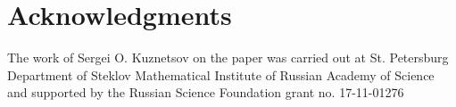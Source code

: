 \documentclass[runningheads]{llncs}
\begin{document}
\section*{Acknowledgments}

The work of Sergei O. Kuznetsov on the paper was carried out
at St. Petersburg Department of Steklov Mathematical Institute of Russian Academy of
Science and supported by the Russian Science Foundation grant no. 17-11-01276

%
%
%


\end{document}
